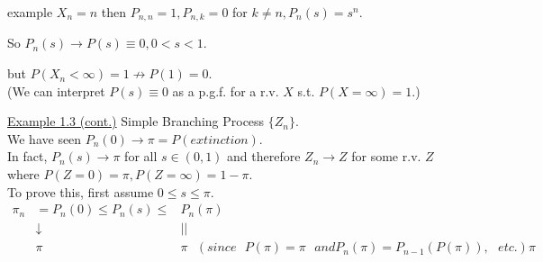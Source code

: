 \documentclass[12pt]{article}
\theoremstyle{definition}
\theoremstyle{plain}
\begin{document}
example  $X_n = n$ then $P_{n,n} = 1, P_{n,k} = 0$ for $k \not = n, P_n(s) = s^n$.


So $P_n(s) \rightarrow P(s) \equiv 0, 0 < s <1$.


but $P(X_n < \infty) = 1 \not \rightarrow P(1) = 0$. \\
(We can interpret $P(s) \equiv 0$ as a p.g.f. for a r.v. $X$ s.t. $P(X = \infty) = 1$.)

\underline{Example 1.3 (cont.)} Simple Branching Process $\{Z_n\}$. \\
We have seen $P_n(0) \rightarrow \pi = P(extinction)$.\\
In fact, $P_n(s) \rightarrow \pi$ for all $s \in (0,1)$ and therefore $Z_n \rightarrow Z$ for some r.v. $Z$ where $P(Z = 0) = \pi, P(Z = \infty) = 1-\pi$.\\
To prove this, first assume $0 \leq s \leq \pi$. \begin{displaymath}\begin{aligned}\pi_n &= P_n(0) \leq P_n(s) \leq &P_n(\pi)\\ &\downarrow  &|| \\ &\pi &\pi \mbox{ } (since \mbox{ } P(\pi) = \pi \mbox{ } and P_n(\pi) = P_{n-1}(P(\pi)), \mbox{ } etc.)\pi\end{aligned}\end{displaymath}




























\clearpage
\end{document}
